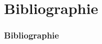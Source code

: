 \documentclass{beamer}
\begin{document}
\section{Bibliographie}
\begin{frame}[t,allowframebreaks]
\frametitle{Bibliographie}
\nocite{knuth:ct}
\printbibliography[heading=none]
\end{frame}
\end{document}
